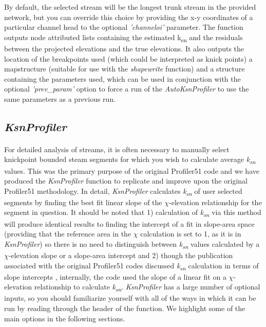 By default, the selected stream will be the longest trunk stream in the provided network, but you can override this choice by providing the x-y coordinates of a particular channel head to the optional \textit{'channeloi'} parameter. The function outputs node attributed lists containing the estimated k\textsubscript{sn} and the residuals between the projected elevations and the true elevations. It also outputs the location of the breakpoints used (which could be interpreted as knick points) a mapstructure (suitable for use with the \textit{shapewrite} function) and a structure containing the parameters used, which can be used in conjunction with the optional \textit{'prev\_param'} option to force a run of the \textit{AutoKsnProfiler} to use the same parameters as a previous run.

\subsection{\textit{KsnProfiler}} \label{sec:KsnProfiler}

\paragraph{}For detailed analysis of streams, it is often necessary to manually select knickpoint bounded steam segments for which you wish to calculate average \textit{k\textsubscript{sn}} values. This was the primary purpose of the original Profiler51 code and we have produced the \textit{KsnProfiler} function to replicate and improve upon the original Profiler51 methodology. In detail, \textit{KsnProfiler} calculates \textit{k\textsubscript{sn}} of user selected segments by finding the best fit linear slope of the $\chi$-elevation relationship for the segment in question. It should be noted that 1) calculation of \textit{k\textsubscript{sn}} via this method will produce identical results to finding the intercept of a fit in slope-area space (providing that the reference area in the $\chi$ calculation is set to 1, as it is in \textit{KsnProfiler}) so there is no need to distinguish between \textit{k\textsubscript{sn}} values calculated by a $\chi$-elevation slope or a slope-area intercept and 2) though the publication associated with the original Profiler51 codes discussed \textit{k\textsubscript{sn}} calculation in terms of slope intercepts \citep{Wobus2006}, internally, the code used the slope of a linear fit on a $\chi$-elevation relationship to calculate \textit{k\textsubscript{sn}}. \textit{KsnProfiler} has a large number of optional inputs, so you should familiarize yourself with all of the ways in which it can be run by reading through the header of the function. We highlight some of the main options in the following sections.

